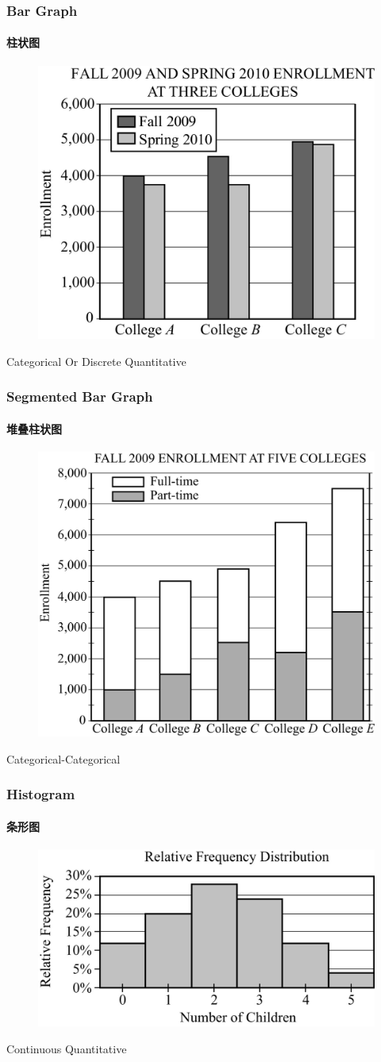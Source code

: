 \documentclass[
	11pt, %
]{beamer}
\begin{document}
\begin{frame}
	\frametitle{Bar Graph}
	\framesubtitle{柱状图} %

	\begin{figure}
		\includegraphics[width=0.5\linewidth]{Bar_Graph.jpg}
	\end{figure}
	\alert{Categorical Or Discrete Quantitative}
\end{frame}


\begin{frame}
	\frametitle{Segmented Bar Graph}
	\framesubtitle{堆叠柱状图} %

	\begin{figure}
		\includegraphics[width=0.5\linewidth]{Segmented_Bar_Graph.jpg}
	\end{figure}
	\alert{Categorical-Categorical}
\end{frame}


\begin{frame}
	\frametitle{Histogram}
	\framesubtitle{条形图} %

	\begin{figure}
		\includegraphics[width=0.5\linewidth]{Histogram.jpg}
	\end{figure}
	\alert{Continuous Quantitative}
\end{frame}
\end{document}
